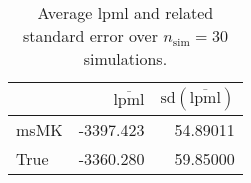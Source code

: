 \begin{table}[H]

\caption{Average lpml and related standard error over $n_{\text{sim}} = 30$ simulations.}
\centering
\begin{tabular}[t]{lrr}
\toprule
  & $\overbar{\text{lpml}}$ & $\text{sd}(\overbar{\text{lpml}})$\\
\midrule
msMK & -3397.423 & 54.89011\\
True & -3360.280 & 59.85000\\
\bottomrule
\end{tabular}
\end{table}